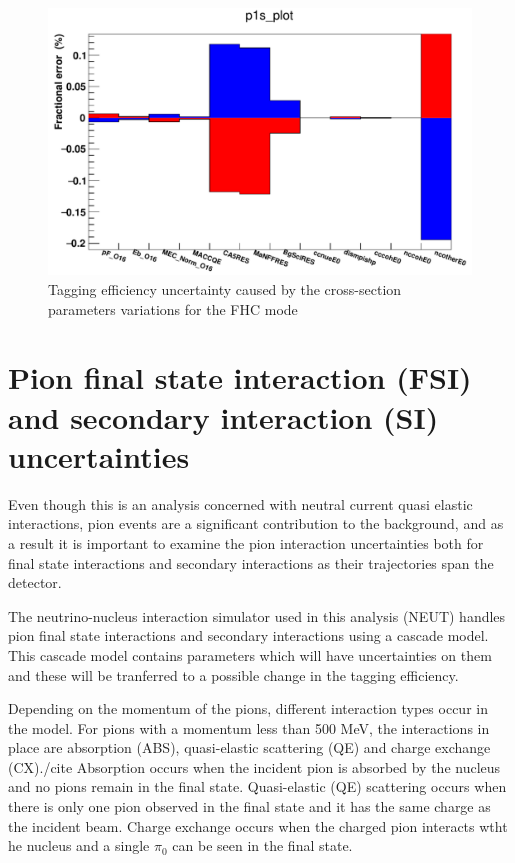 \begin{figure}[H]
    \includegraphics[scale=0.4]{Figures/xsec_uncertainty.png}
\caption{Tagging efficiency uncertainty caused by the cross-section parameters variations for the FHC mode}
\label{fig:xsecuncertainty}
\end{figure}

\section{Pion final state interaction (FSI) and secondary interaction (SI) uncertainties}

Even though this is an analysis concerned with neutral current quasi elastic interactions, pion events are a significant contribution to the background, and as a result it is important to examine the pion interaction uncertainties both for final state interactions and secondary interactions as their trajectories span the detector. 
\newline


The neutrino-nucleus interaction simulator used in this analysis (NEUT) handles pion final state interactions and secondary interactions using a cascade model. This cascade model contains parameters which will have uncertainties on them and these will be tranferred to a possible change in the tagging efficiency.

Depending on the momentum of the pions, different interaction types occur in the model. For pions with a momentum less than 500 MeV, the interactions in place are absorption (ABS), quasi-elastic scattering (QE) and charge exchange (CX)./cite{} Absorption occurs when the incident pion is absorbed by the nucleus and no pions remain in the final state. Quasi-elastic (QE) scattering occurs when there is only one pion observed in the final state and it has the same charge as the incident beam. Charge exchange occurs when the charged pion interacts wtht he nucleus and a single $\pi_{0}$ can be seen in the final state.


